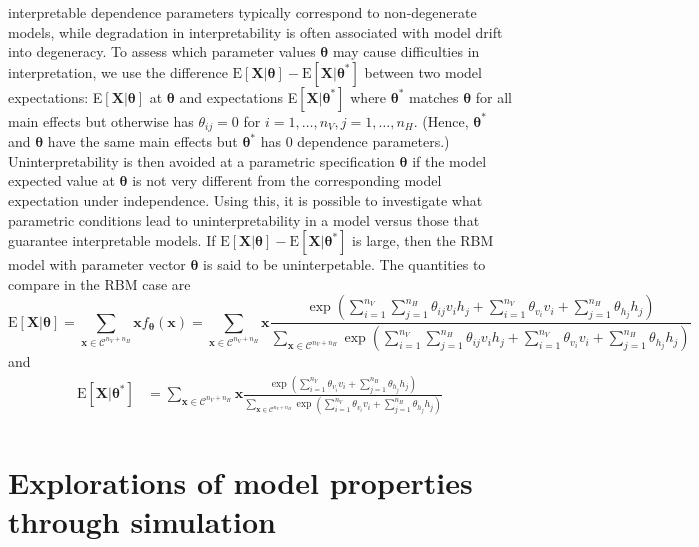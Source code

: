 \documentclass[]{article}
\theoremstyle{definition}
\newcommand{\nv}{{n_{\scriptscriptstyle V}}}
\newcommand{\nh}{{n_{\scriptscriptstyle H}}}
\begin{document}
interpretable dependence parameters typically correspond to
non-degenerate models, while degradation in interpretability is often
associated with model drift into degeneracy. To assess which parameter
values \(\boldsymbol \theta\) may cause difficulties in interpretation,
we use the difference
\(\text{E}\left[\boldsymbol X | \boldsymbol \theta\right] - \text{E}\left[\boldsymbol X | \boldsymbol \theta^* \right]\)
between two model expectations:
E\(\left[\boldsymbol X | \boldsymbol \theta\right]\) at
\(\boldsymbol \theta\) and expectations
E\(\left[\boldsymbol X | \boldsymbol \theta^* \right]\) where
\(\boldsymbol \theta^*\) matches \(\boldsymbol \theta\) for all main
effects but otherwise has \(\theta_{ij} = 0\) for
\(i = 1, \dots, \nv, j = 1, \dots, \nh\). (Hence,
\(\boldsymbol \theta^*\) and \(\boldsymbol \theta\) have the same main
effects but \(\boldsymbol \theta^*\) has \(0\) dependence parameters.)
Uninterpretability is then avoided at a parametric specification
\(\boldsymbol \theta\) if the model expected value at
\(\boldsymbol \theta\) is not very different from the corresponding
model expectation under independence. Using this, it is possible to
investigate what parametric conditions lead to uninterpretability in a
model versus those that guarantee interpretable models. If
\(\text{E}\left[\boldsymbol X | \boldsymbol \theta\right] - \text{E}\left[\boldsymbol X | \boldsymbol \theta^*\right]\)
is large, then the RBM model with parameter vector
\(\boldsymbol \theta\) is said to be uninterpetable. The quantities to
compare in the RBM case are \[
\text{E}\left[\boldsymbol X | \boldsymbol \theta\right] = \sum\limits_{\boldsymbol x \in \mathcal{C}^{\nv + \nh}} \boldsymbol x f_{\boldsymbol \theta}(\boldsymbol x) = \sum\limits_{\boldsymbol x \in \mathcal{C}^{\nv + \nh}} \boldsymbol x \frac{\exp\left(\sum\limits_{i = 1}^\nv \sum\limits_{j=1}^\nh \theta_{ij} v_i h_j + \sum\limits_{i = 1}^\nv\theta_{v_i} v_i + \sum\limits_{j = 1}^\nh\theta_{h_j} h_j\right)}{\sum\limits_{\boldsymbol x \in \mathcal{C}^{\nv + \nh}}\exp\left(\sum\limits_{i = 1}^\nv \sum\limits_{j=1}^\nh \theta_{ij} v_i h_j + \sum\limits_{i = 1}^\nv\theta_{v_i} v_i + \sum\limits_{j = 1}^\nh\theta_{h_j} h_j\right)}
\] and \begin{align*}
\text{E}\left[\boldsymbol X | \boldsymbol 
\theta^*\right] &= \sum\limits_{\boldsymbol x \in \mathcal{C}^{\nv + \nh}} \boldsymbol x \frac{\exp\left(\sum\limits_{i = 1}^\nv \theta_{v_i} v_i + \sum\limits_{j = 1}^\nh\theta_{h_j} h_j\right)}{\sum\limits_{\boldsymbol x \in \mathcal{C}^{\nv + \nh}}\exp\left(\sum\limits_{i = 1}^\nv\theta_{v_i} v_i + \sum\limits_{j = 1}^\nh\theta_{h_j} h_j\right)} \\
\end{align*}
\hypertarget{explorations-of-model-properties-through-simulation}{%
\section{Explorations of model properties through
simulation}\label{explorations-of-model-properties-through-simulation}}
\end{document}
